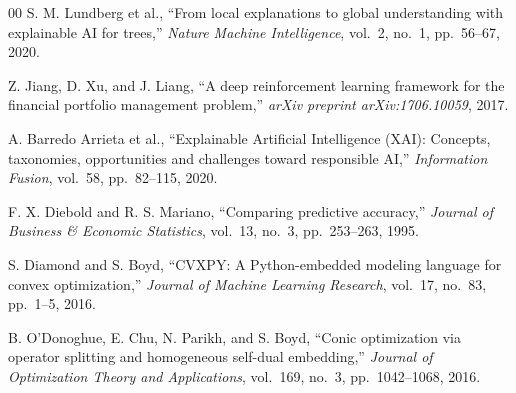 \documentclass[conference]{IEEEtran}
\begin{document}
\begin{thebibliography}{00}
 S. M. Lundberg et al., ``From local explanations
to global understanding with explainable AI for trees,'' \emph{Nature
Machine Intelligence}, vol.~2, no.~1, pp.~56--67, 2020.

 Z. Jiang, D. Xu, and J. Liang, ``A deep
reinforcement learning framework for the financial portfolio management
problem,'' \emph{arXiv preprint arXiv:1706.10059}, 2017.

 A. Barredo Arrieta et al., ``Explainable
Artificial Intelligence (XAI): Concepts, taxonomies, opportunities and
challenges toward responsible AI,'' \emph{Information Fusion}, vol.~58,
pp.~82--115, 2020.

 F. X. Diebold and R. S. Mariano, ``Comparing
predictive accuracy,'' \emph{Journal of Business \& Economic
Statistics}, vol.~13, no.~3, pp.~253--263, 1995.

 S. Diamond and S. Boyd, ``CVXPY: A Python-embedded
modeling language for convex optimization,'' \emph{Journal of Machine
Learning Research}, vol.~17, no.~83, pp.~1--5, 2016.

 B. O'Donoghue, E. Chu, N. Parikh, and S. Boyd,
``Conic optimization via operator splitting and homogeneous self-dual
embedding,'' \emph{Journal of Optimization Theory and Applications},
vol.~169, no.~3, pp.~1042--1068, 2016.

\end{thebibliography}
\end{document}
